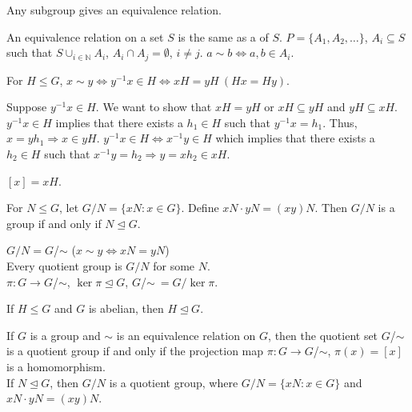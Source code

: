 \documentclass{mathnotes}
\begin{document}
Any subgroup gives an equivalence relation.

\begin{defi}
  An equivalence relation on a set $S$ is the same as a  of
  $S$. $P=\{A_1,A_2,\ldots\}$, $A_i\subseteq S$ such that
  $S\cup_{i\in\mathbb{N}}A_i$, $A_i\cap A_j=\emptyset$, $i\ne j$. $a\sim
  b\Leftrightarrow a,b\in A_i$.
\end{defi}

\begin{prop}
  For $H\le G$, $x\sim y\Leftrightarrow y^{-1}x\in H\Leftrightarrow xH=yH\
  (Hx=Hy)$.
\end{prop}

\begin{pf}
  Suppose $y^{-1}x\in H$. We want to show that $xH=yH$ or $xH\subseteq yH$ and
  $yH\subseteq xH$. $y^{-1}x\in H$ implies that there exists a $h_1\in H$ such
  that $y^{-1}x=h_1$. Thus, $x=yh_1\Rightarrow x\in yH$. $y^{-1}x\in
  H\Leftrightarrow x^{-1}y\in H$ which implies that there exists a $h_2\in H$
  such that $x^{-1}y=h_2\Rightarrow y=xh_2\in xH$.
\end{pf}

\begin{note}
  $[x]=xH$.
\end{note}

\begin{prop}
  For $N\le G$, let $G/N=\{xN:x\in G\}$. Define $xN\cdot yN=(xy)N$. Then $G/N$
  is a group if and only if $N\unlhd G$.
\end{prop}

$G/N=G$/$\sim$ ($x\sim y\Leftrightarrow xN=yN$)\\

Every quotient group is $G/N$ for some $N$.\\

$\pi:G\rightarrow G$/$\sim$, $\ker\pi\unlhd G$, $G$/$\sim\ =G/\ker\pi$.

\begin{prop}
  If $H\le G$ and $G$ is abelian, then $H\unlhd G$.
\end{prop}

If $G$ is a group and $\sim$ is an equivalence relation on $G$, then the
quotient set $G$/$\sim$ is a quotient group if and only if the projection map
$\pi:G\rightarrow G$/$\sim$, $\pi(x)=[x]$ is a homomorphism.\\

If $N\unlhd G$, then $G/N$ is a quotient group, where $G/N=\{xN:x\in G\}$ and
$xN\cdot yN=(xy)N$.\\
\end{document}
